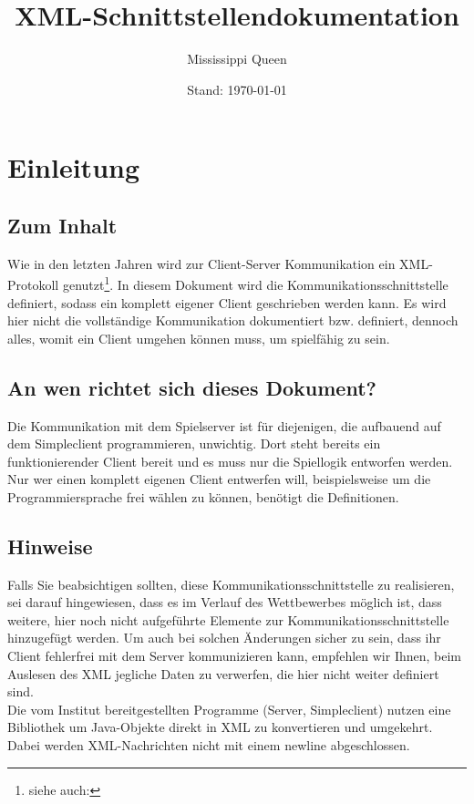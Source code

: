 \documentclass[12pt,a4paper, ngerman, oneside]{scrartcl}
\title{XML-Schnittstellendokumentation}
\subtitle{Mississippi Queen}
\date{Stand: \today}
\begin{document}
\maketitle
\thispagestyle{empty}
\tableofcontents
\thispagestyle{empty}
\newpage
\setcounter{page}{1}
\section{Einleitung}
\subsection*{Zum Inhalt}

Wie in den letzten Jahren wird zur Client-Server Kommunikation ein XML-Protokoll
genutzt\footnote{siehe auch: }.
In diesem Dokument wird die Kommunikationsschnittstelle definiert, sodass ein
komplett eigener Client geschrieben werden kann. Es wird hier nicht die
vollständige Kommunikation dokumentiert bzw. definiert, dennoch alles, womit ein
Client umgehen können muss, um spielfähig zu sein.

\subsection*{An wen richtet sich dieses Dokument?}

Die Kommunikation mit dem Spielserver ist für diejenigen, die aufbauend auf dem
Simpleclient programmieren, unwichtig. Dort steht bereits ein funktionierender
Client bereit und es muss nur die Spiellogik entworfen werden. \\ Nur wer einen
komplett eigenen Client entwerfen will, beispielsweise um die Programmiersprache
frei wählen zu können, benötigt die Definitionen.

\subsection*{Hinweise}

Falls Sie beabsichtigen sollten, diese Kommunikationsschnittstelle zu
realisieren, sei darauf hingewiesen, dass es im Verlauf des Wettbewerbes möglich
ist, dass weitere, hier noch nicht aufgeführte Elemente zur
Kommunikationsschnittstelle hinzugefügt werden. Um auch bei solchen Änderungen
sicher zu sein, dass ihr Client fehlerfrei mit dem Server kommunizieren kann,
empfehlen wir Ihnen, beim Auslesen des XML jegliche Daten zu verwerfen, die hier
nicht weiter definiert sind. \bigskip \\ Die vom Institut bereitgestellten
Programme (Server, Simpleclient) nutzen eine Bibliothek um Java-Objekte direkt
in XML zu konvertieren und umgekehrt. Dabei werden XML-Nachrichten nicht mit
einem newline abgeschlossen.
\end{document}
